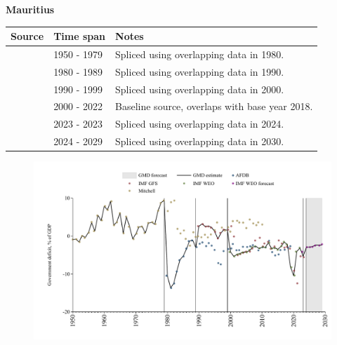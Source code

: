 \documentclass[12pt,a4paper,landscape]{article}
\begin{document}
\begin{adjustbox}{max totalsize={\paperwidth}{\paperheight},center}
\begin{minipage}[t][\textheight][t]{\textwidth}
\vspace*{0.5cm}
{}
\begin{center}
{\Large\bfseries Mauritius}
\end{center}
\vspace{0.5cm}
\begin{table}[H]
\centering
\small
\begin{tabular}{|l|l|l|}
\hline
\textbf{Source} & \textbf{Time span} & \textbf{Notes} \\
\hline
\rowcolor{white}\cite{Mitchell}& 1950 - 1979 &Spliced using overlapping data in 1980.\\
\rowcolor{lightgray}\cite{AFDB}& 1980 - 1989 &Spliced using overlapping data in 1990.\\
\rowcolor{white}\cite{IMF_GFS}& 1990 - 1999 &Spliced using overlapping data in 2000.\\
\rowcolor{lightgray}\cite{IMF_WEO}& 2000 - 2022 &Baseline source, overlaps with base year 2018.\\
\rowcolor{white}\cite{IMF_GFS}& 2023 - 2023 &Spliced using overlapping data in 2024.\\
\rowcolor{lightgray}\cite{IMF_WEO_forecast}& 2024 - 2029 &Spliced using overlapping data in 2030.\\
\hline
\end{tabular}
\end{table}
\begin{figure}[H]
\centering
\includegraphics[width=\textwidth,height=0.6\textheight,keepaspectratio]{graphs/MUS_govdef_GDP.pdf}
\end{figure}
\end{minipage}
\end{adjustbox}
\end{document}
